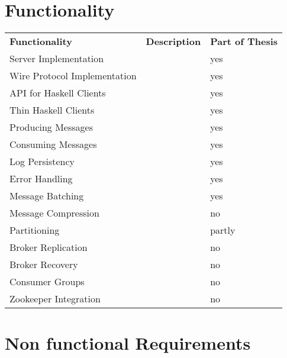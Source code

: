 \section{Functionality}
\begin{table}[h]
\begin{tabular}{lll}
\textbf{Functionality}       & \textbf{Description} & \textbf{Part of Thesis} \\
Server Implementation        &                      & yes                     \\
Wire Protocol Implementation &                      & yes                     \\
API for Haskell Clients      &                      & yes                     \\
Thin Haskell Clients         &                      & yes                     \\
Producing Messages           &                      & yes                     \\
Consuming Messages           &                      & yes                     \\
Log Persistency              &                      & yes                     \\
Error Handling               &                      & yes                     \\
Message Batching             &                      & yes                     \\
Message Compression          &                      & no                      \\
Partitioning                 &                      & partly                  \\
Broker Replication           &                      & no                      \\
Broker Recovery              &                      & no                      \\
Consumer Groups              &                      & no                      \\
Zookeeper Integration        &                      & no                     
\end{tabular}
\end{table}

\section{Non functional Requirements}

